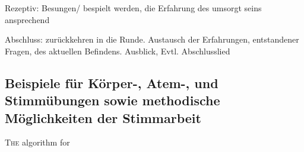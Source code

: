 Rezeptiv: 
Besungen/ bespielt werden, die Erfahrung des umsorgt seins ansprechend

Abschluss: 
zurückkehren in die Runde. Austausch der Erfahrungen, entstandener Fragen, des aktuellen Befindens. Ausblick, Evtl. Abschlusslied


\subsection{Beispiele für Körper-, Atem-, und Stimmübungen sowie methodische Möglichkeiten der Stimmarbeit}



\ifpdf
    \graphicspath{{5_konzept/figures/PNG/}{5_konzept/figures/PDF/}{5_konzept/figures/}}
\else
    \graphicspath{{5_konzept/figures/EPS/}{5_konzept/figures/}}
\fi

\lettrine{T}{he} algorithm for

\newpage\thispagestyle{empty}
